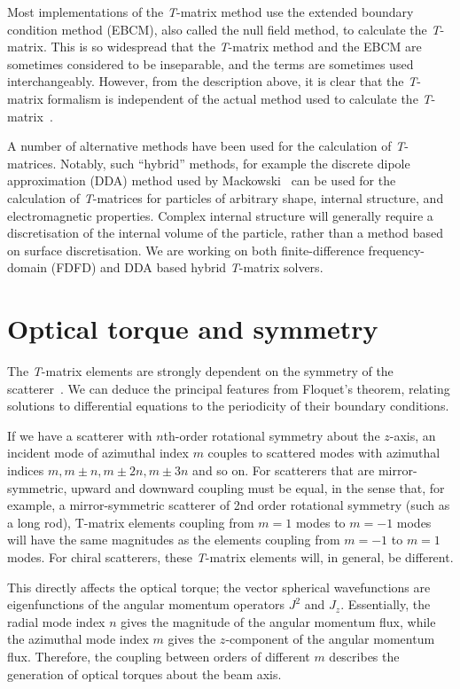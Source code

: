 \documentclass{article}
\begin{document}
Most implementations of the \textit{T}-matrix method use the extended
boundary condition method (EBCM), also called the null field method, to
calculate the \textit{T}-matrix. This is so widespread that the
\textit{T}-matrix method and the EBCM are sometimes considered to be
inseparable, and the terms are sometimes used interchangeably.
However, from the description above, it is clear that the \textit{T}-matrix
formalism is independent of the actual method used to calculate the
\textit{T}-matrix~\cite{kahnert2003b,nieminen2003b}.

A number of alternative methods have been used for the calculation of
\textit{T}-matrices.
Notably, such ``hybrid'' methods, for example the discrete dipole
approximation (DDA) method used by
Mackowski~\cite{mackowski2002} can be used for the calculation of
\textit{T}-matrices for particles of arbitrary shape, internal structure,
and electromagnetic properties. Complex internal structure will generally
require a discretisation of the internal volume of the particle, rather
than a method based on surface discretisation. We are working on
both finite-difference frequency-domain (FDFD) and DDA
based hybrid \textit{T}-matrix solvers.

\section{Optical torque and symmetry}

The \textit{T}-matrix elements are strongly dependent on the symmetry
of the scatterer~\cite{waterman1971}. We can deduce the principal features
from Floquet's theorem, relating solutions to differential equations to
the periodicity of their boundary conditions.

If we have a scatterer with $n$th-order rotational symmetry about the
$z$-axis, an incident mode of azimuthal index $m$ couples to scattered
modes with azimuthal indices $m, m\pm n, m\pm 2n, m\pm 3n$ and so on. For
scatterers that are mirror-symmetric, upward and downward coupling must be
equal, in the sense that, for example, a mirror-symmetric scatterer of
2nd order rotational symmetry (such as a long rod), {T}-matrix elements
coupling from $m = 1$ modes to $m = -1$ modes will have the same magnitudes
as the elements coupling from $m = -1$ to $m = 1$ modes. For chiral
scatterers, these \textit{T}-matrix elements will, in general, be different.

This directly affects the optical torque; the vector spherical wavefunctions
are eigenfunctions of the angular momentum operators $J^2$ and $J_z$.
Essentially, the radial mode index $n$ gives the magnitude of the
angular momentum flux, while the azimuthal mode index $m$ gives
the $z$-component of the angular momentum flux. Therefore, the coupling
between orders of different $m$ describes the generation of optical
torques about the beam axis.
\end{document}

